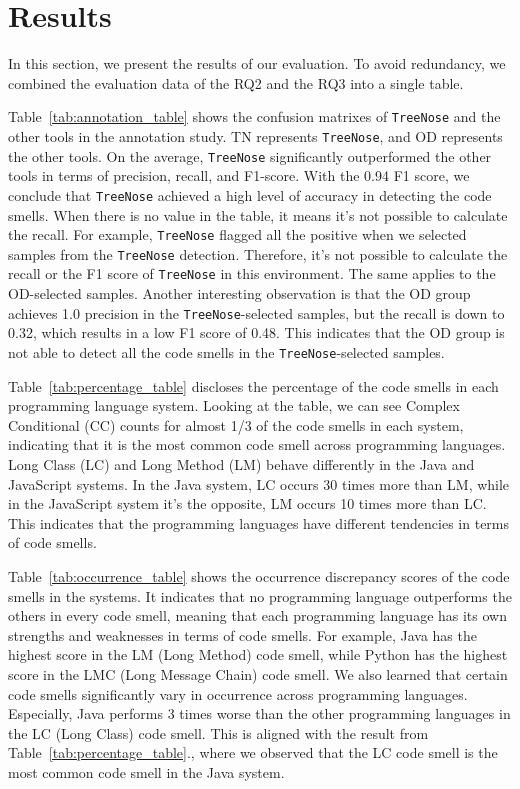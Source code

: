 \section{Results}
\label{sec:results}

In this section, we present the results of our evaluation. To avoid redundancy, we combined the evaluation data of the RQ2 and the RQ3 into a single table.


Table~\ref{tab:annotation_table} shows the confusion matrixes of \texttt{TreeNose} and the other tools in the annotation study. TN represents \texttt{TreeNose}, and OD represents the other tools.
On the average, \texttt{TreeNose} significantly outperformed the other tools in terms of precision, recall, and F1-score.
With the 0.94 F1 score, we conclude that \texttt{TreeNose} achieved a high level of accuracy in detecting the code smells.
When there is no value in the table, it means it's not possible to calculate the recall. For example, 
\texttt{TreeNose} flagged all the positive when we selected samples from the \texttt{TreeNose} detection. Therefore, it's not
possible to calculate the recall or the F1 score of \texttt{TreeNose} in this environment. The same applies to the OD-selected samples.
Another interesting observation is that the OD group achieves 1.0 precision in the \texttt{TreeNose}-selected samples, but the recall is down to 0.32,
which results in a low F1 score of 0.48. This indicates that the OD group is not able to detect all the code smells in the \texttt{TreeNose}-selected samples.

Table~\ref{tab:percentage_table} discloses the percentage of the code smells in each programming language system. Looking at the table, we can see Complex Conditional (CC)
counts for almost 1/3 of the code smells in each system, indicating that it is the most common code smell across programming languages. 
Long Class (LC) and Long Method (LM) behave differently in the Java and JavaScript systems. In the Java system,
LC occurs 30 times more than LM, while in the JavaScript system it's the opposite, LM occurs 10 times more than LC. This indicates that the programming languages
have different tendencies in terms of code smells.

Table~\ref{tab:occurrence_table} shows the occurrence discrepancy scores of the code smells in the systems. It indicates that no programming language outperforms the others in every code smell,
meaning that each programming language has its own strengths and weaknesses in terms of code smells. For example, Java has the highest score in the LM (Long Method) code smell,
 while Python has the highest score in the LMC (Long Message Chain) code smell. We also learned that certain code smells significantly vary in occurrence across programming languages.
 Especially, Java performs 3 times worse than the other programming languages in the LC (Long Class) code smell. 
 This is aligned with the result from Table~\ref{tab:percentage_table}., where we observed that the LC code smell is the most common code smell in the Java system.







